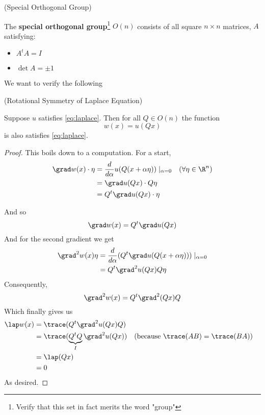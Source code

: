 \documentclass{bkcnotes}
\begin{document}
\begin{ndefn}(Special Orthogonal Group)
  
  The \textbf{special orthogonal group}\footnote{Verify that this set
    in fact merits the word "group"} $O(n)$ consists of all square $n
  \times n$ matrices, $A$ satisfying:
  \begin{itemize}
  \item $A^tA = I$
  \item $\det A = \pm 1$
  \end{itemize}
\end{ndefn}
We want to verify the following
\begin{nprop}(Rotational Symmetry of Laplace Equation)

  Suppose $u$ satisfies \eqref{eq:laplace}. Then for all $Q \in O(n)$
  the function
  \begin{equation}
    \label{eq:w}
    w(x) = u(Qx)
  \end{equation}
  is also satisfies \eqref{eq:laplace}.
\end{nprop}
\begin{proof}
  This boils down to a computation. For a start,
  \begin{equation}
    \label{eq:w-grad-comp}
    \begin{aligned}
      \grad w(x) \cdot \eta &= \frac{d}{d\alpha}
      u(Q(x+\alpha\eta))\mid_{\alpha=0}
      && (\forall\eta \in \R^n) \\
      &= \grad u(Qx)\cdot Q\eta \\
      &= Q^t\grad u(Qx)\cdot \eta
    \end{aligned}
  \end{equation}

  And so
  \begin{equation}
    \label{eq:grad-w}
    \grad w(x) = Q^t\grad u(Qx)
  \end{equation}
  And for the second gradient we get
  \begin{equation}
    \label{eq:w-snd-grad-comp}
    \begin{aligned}
      \grad^2w(x)\eta &= \frac{d}{d\alpha}(Q^t\grad
      u(Q(x+\alpha\eta)))\mid_{\alpha=0} \\
      &= Q^t\grad^2u(Qx)Q\eta
    \end{aligned}
  \end{equation}
  Consequently,
  \begin{equation}
    \label{eq:w-snd-grad}
    \grad^2w(x) = Q^t\grad^2(Qx)Q
  \end{equation}
  Which finally gives us
  \begin{equation}
    \label{eq:lap-w}
    \begin{aligned}
      \lap w(x) &= \trace (Q^t\grad^2u(Qx)Q) \\
      &= \trace (\underbrace{Q^tQ}_{I}\grad^2u(Qx))
      && (\text{because } \trace (AB) = \trace(BA)) \\
      &= \lap(Qx) \\
      &= 0
    \end{aligned}
  \end{equation}
  As desired.
\end{proof}
\end{document}
